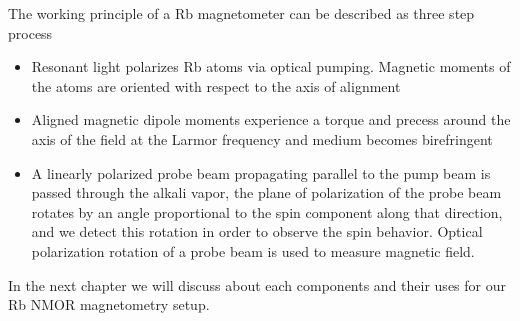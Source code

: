 The working principle of a Rb magnetometer can be described as three step process
\begin{itemize}
\item
Resonant light polarizes Rb atoms via optical pumping. Magnetic
moments of the atoms are oriented with respect to the axis of
alignment
\end{itemize}
\begin{itemize}
\item Aligned magnetic dipole moments experience a torque and precess around the axis of the field at the Larmor frequency and medium becomes birefringent
\end{itemize}
\begin{itemize}
\item A linearly polarized probe beam propagating parallel to the
pump beam is passed through the alkali vapor, the plane of polarization of the probe beam
rotates by an angle proportional to the spin component along that direction, and we detect
this rotation in order to observe the spin behavior. Optical polarization rotation of a probe beam is used to measure magnetic field.
\end{itemize}

In the next chapter we will discuss about each components and their uses  for our Rb NMOR magnetometry setup.
